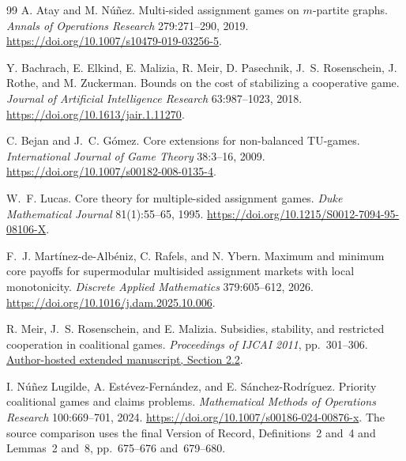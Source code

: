\documentclass[11pt]{article}
\theoremstyle{remark}
\begin{document}
\begin{thebibliography}{99}
\small
{}
A. Atay and M. N\'u\~nez.
Multi-sided assignment games on $m$-partite graphs.
\emph{Annals of Operations Research} 279:271--290, 2019.
\href{https://doi.org/10.1007/s10479-019-03256-5}{https://doi.org/10.1007/s10479-019-03256-5}.

Y. Bachrach, E. Elkind, E. Malizia, R. Meir, D. Pasechnik,
J.~S. Rosenschein, J. Rothe, and M. Zuckerman.
Bounds on the cost of stabilizing a cooperative game.
\emph{Journal of Artificial Intelligence Research} 63:987--1023, 2018.
\href{https://doi.org/10.1613/jair.1.11270}{https://doi.org/10.1613/jair.1.11270}.

C. Bejan and J.~C. G\'omez. Core extensions for non-balanced TU-games.
\emph{International Journal of Game Theory} 38:3--16, 2009.
\href{https://doi.org/10.1007/s00182-008-0135-4}{https://doi.org/10.1007/s00182-008-0135-4}.

W.~F. Lucas. Core theory for multiple-sided assignment games.
\emph{Duke Mathematical Journal} 81(1):55--65, 1995.
\href{https://doi.org/10.1215/S0012-7094-95-08106-X}{https://doi.org/10.1215/S0012-7094-95-08106-X}.

F.~J. Mart\'inez-de-Alb\'eniz, C. Rafels, and N. Ybern.
Maximum and minimum core payoffs for supermodular multisided assignment
markets with local monotonicity.
\emph{Discrete Applied Mathematics} 379:605--612, 2026.
\href{https://doi.org/10.1016/j.dam.2025.10.006}{https://doi.org/10.1016/j.dam.2025.10.006}.

R. Meir, J.~S. Rosenschein, and E. Malizia.
Subsidies, stability, and restricted cooperation in coalitional games.
\emph{Proceedings of IJCAI 2011}, pp.~301--306.
\href{https://www.cs.huji.ac.il/~jeff/papers/coopmas11meir.pdf}{Author-hosted extended manuscript, Section 2.2}.

I. N\'u\~nez Lugilde, A. Est\'evez-Fern\'andez, and E. S\'anchez-Rodr\'iguez.
Priority coalitional games and claims problems.
\emph{Mathematical Methods of Operations Research} 100:669--701, 2024.
\href{https://doi.org/10.1007/s00186-024-00876-x}{https://doi.org/10.1007/s00186-024-00876-x}.
The source comparison uses the final Version of Record, Definitions~2 and~4
and Lemmas~2 and~8, pp.~675--676 and~679--680.


\end{thebibliography}
\end{document}
